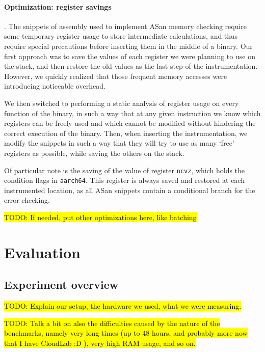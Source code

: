 \documentclass[a4paper,11pt,oneside]{report}
\newcommand{\todo}[1]{%
	\begingroup 
	\sethlcolor{cyan}%
	\hl{TODO: #1}%
	\endgroup
}
\begin{document}
\subsubsection{Optimization: register savings}.
The snippets of assembly used to implement ASan memory checking require some 
temporary register usage to store intermediate calculations, and thus require 
special precautions before inserting them in the middle of a binary. Our first 
approach was to save the values of each register we were planning to use on the 
stack, and then restore the old values as the last step of the instrumentation.  
However, we quickly realized that those frequent memory accesses were 
introducing noticeable overhead. 

We then switched to performing a static analysis of register usage on every 
function of the binary, in such a way that at any given instruction we know 
which registers can be freely used and which cannot be modified without 
hindering the correct execution of the binary. Then, when inserting the 
instrumentation, we modify the snippets in such a way that they will try to use 
as many `free' registers as possible, while saving the others on the stack.

Of particular note is the saving of the value of register \texttt{ncvz}, which 
holds the condition flags in \texttt{aarch64}. This register is always saved 
and restored at each instrumented location, as all ASan snippets contain a 
conditional branch for the error checking. 

\todo{If needed, put other optimizations here, like batching}


\chapter{Evaluation}


\section{Experiment overview}
\todo{Explain our setup, the hardware we used, what we were measuring.}

\todo{Talk a bit on also the difficulties caused by the nature of the 
benchmarks, namely very long times (up to 48 hours, and probably more now that 
I have CloudLab :D ), very high RAM usage, and so on.}
\end{document}
